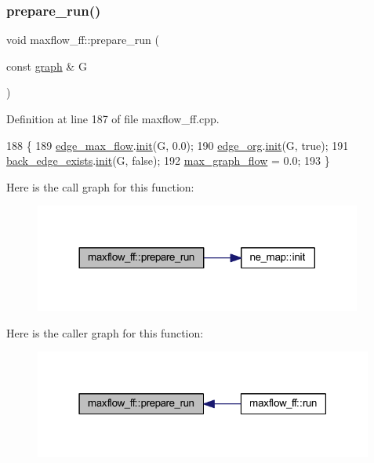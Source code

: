 \subsubsection{\texorpdfstring{prepare\+\_\+run()}{prepare\_run()}}
{\footnotesize\ttfamily void maxflow\+\_\+ff\+::prepare\+\_\+run (\begin{DoxyParamCaption}\item[{const \mbox{\hyperlink{classgraph}{graph}} \&}]{G }\end{DoxyParamCaption})\hspace{0.3cm}{\ttfamily [protected]}}



Definition at line 187 of file maxflow\+\_\+ff.\+cpp.


\begin{DoxyCode}
188 \{
189     \mbox{\hyperlink{classmaxflow__ff_a669f36f1fae2dd0f6cfc0172e3ae0e8f}{edge\_max\_flow}}.\mbox{\hyperlink{classne__map_a4ef2ab4aebcb57a7a101975bf6a88e24}{init}}(G, 0.0);
190     \mbox{\hyperlink{classmaxflow__ff_aa9fd46b8da1a67678b132a17e7a41c91}{edge\_org}}.\mbox{\hyperlink{classne__map_a4ef2ab4aebcb57a7a101975bf6a88e24}{init}}(G, \textcolor{keyword}{true});
191     \mbox{\hyperlink{classmaxflow__ff_a686006593b17dfd3ad9a5e02b1ad9e92}{back\_edge\_exists}}.\mbox{\hyperlink{classne__map_a4ef2ab4aebcb57a7a101975bf6a88e24}{init}}(G, \textcolor{keyword}{false});
192     \mbox{\hyperlink{classmaxflow__ff_a7a2f530f9c95b6f37f4c349427a0f9bb}{max\_graph\_flow}} = 0.0;
193 \}
\end{DoxyCode}
Here is the call graph for this function\+:\nopagebreak
\begin{figure}[H]
\begin{center}
\leavevmode
\includegraphics[width=305pt]{classmaxflow__ff_a8ad20b45a7d30070bb65e68758c2f7d3_cgraph}
\end{center}
\end{figure}
Here is the caller graph for this function\+:\nopagebreak
\begin{figure}[H]
\begin{center}
\leavevmode
\includegraphics[width=316pt]{classmaxflow__ff_a8ad20b45a7d30070bb65e68758c2f7d3_icgraph}
\end{center}
\end{figure}
\mbox{\label{classmaxflow__ff_a893e5136d4f7f1d4b67ef5b67306d17b}} 
